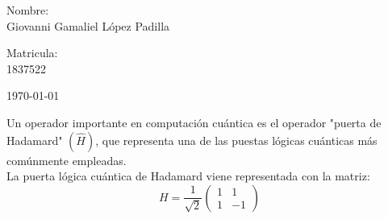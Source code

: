 \documentclass[12pt,letterpaper]{report}
\begin{document}
\begin{titlepage}
\begin{center}
\begin{minipage}{0.6\linewidth}
\changefontsizes{14pt}
Nombre:\\                                                                                                                                                                                                                                                           
Giovanni Gamaliel López Padilla\\
\end{minipage}
\begin{minipage}{0.2\linewidth}
\changefontsizes{14pt} 
Matricula:\\                                                                                                                        
1837522
\end{minipage}
\end{center}
\vspace{4cm}
\begin{flushright}
\today
\end{flushright}
\end{titlepage}
Un operador importante en computación cuántica es el operador "puerta de Hadamard" $(\hat{H})$, que representa una de las puestas lógicas cuánticas más comúnmente empleadas.\\
La puerta lógica cuántica de Hadamard viene representada con la matriz:
\begin{equation*}
    H=\frac{1}{\sqrt{2}}\left(\begin{matrix}1 & 1 \\ 
    1 & -1\end{matrix}\right)
\end{equation*}
\end{document}
